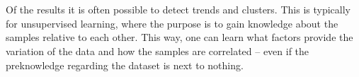 \\\\
Of the results it is often possible to detect trends and clusters. This is typically for unsupervised learning, where the purpose is to gain knowledge about the samples relative to each other. This way, one can learn what factors provide the variation of the data and how the samples are correlated – even if the preknowledge regarding the dataset is next to nothing. 
\begin{figure}[H] \label{fig:pca1}
  \newcommand*\FigVSkip{0.5em}
  \newcommand*\FigHSkip{0.1em}
  \newsavebox\FigBox
  \centering
  \begin{minipage}{\wd\FigBox}
    \centering\usebox{\FigBox}
  \end{minipage}
  \begin{minipage}{\wd\FigBox}

\end{minipage}
\end{figure}
